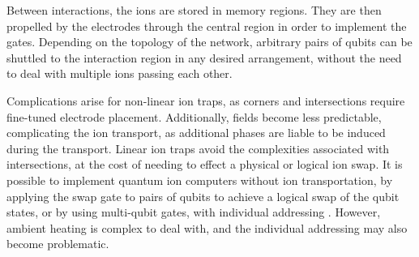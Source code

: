 \documentclass[12pt,a4paper]{amsart}
\numberwithin{equation}{section}
\theoremstyle{plain}
\theoremstyle{definition}
\begin{document}
Between interactions, the ions are stored in memory regions. They are then propelled by the electrodes through the central region in order to implement the gates. Depending on the topology of the network, arbitrary pairs of qubits can be shuttled to the interaction region in any desired arrangement, without the need to deal with multiple ions passing each other. 


Complications arise for non-linear ion traps, as corners and intersections require fine-tuned electrode placement. Additionally, fields become less predictable, complicating the ion transport, as additional phases are liable to be induced during the transport. Linear ion traps avoid the complexities associated with intersections, at the cost of needing to effect a physical or logical ion swap. It is possible to implement quantum ion computers without ion transportation, by applying the swap gate to pairs of qubits to achieve a logical swap of the qubit states, or by using multi-qubit gates, with individual addressing \cite{fundQuanIoni}. However, ambient heating is complex to deal with, and the individual addressing may also become problematic.
\end{document}
